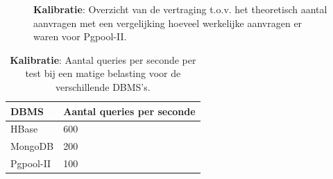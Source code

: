\begin{figure}[htb!] 
	\centering
	\caption{\textbf{Kalibratie}: Overzicht van de vertraging t.o.v. het theoretisch aantal aanvragen met een vergelijking hoeveel werkelijke aanvragen er waren voor Pgpool-II. }
	\label{fig:calibratie-queriesperseconde-pgpool-ii}
\end{figure}

\begin{table}[htb!]
	\centering
	\begin{tabular}{l| l }
		\textbf{DBMS} & Aantal queries per seconde \\
		\hline
		HBase & 600 \\
		MongoDB & 200\\
		Pgpool-II & 100\\
	\end{tabular}
	\caption{\textbf{Kalibratie}: Aantal queries per seconde per test bij een matige belasting voor de verschillende DBMS's.}
	\label{table:calibratie-queriesperseconde-resultaat}
\end{table}


